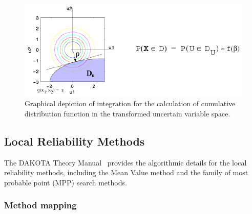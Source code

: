 \begin{figure}
  \centering
  \includegraphics[scale=0.75]{images/cdf_tran_graphic}
  \caption{Graphical depiction of integration for the calculation of
    cumulative distribution function in the transformed uncertain
    variable space.}
  \label{uq:figure06}
\end{figure}

\subsection{Local Reliability Methods}\label{uq:reliability:local}

The DAKOTA Theory Manual~\cite{TheoMan} provides the algorithmic
details for the local reliability methods, including the Mean Value
method and the family of most probable point (MPP) search methods.


\subsubsection{Method mapping} \label{uq:reliability:local:map}

